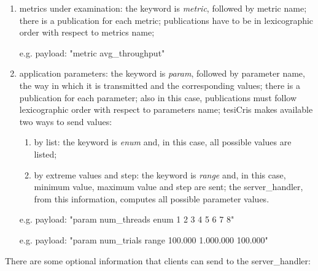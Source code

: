 \begin{enumerate}

    \item metrics under examination: the keyword is \textit{metric}, followed by metric name; there is a publication for each metric; publications have to be in lexicographic order with respect to metrics name;
    
    e.g. payload: "metric avg\_throughput"
    
    \item application parameters: the keyword is \textit{param}, followed by parameter name, the way in which it is transmitted and the corresponding values; there is a publication for each parameter; also in this case, publications must follow lexicographic order with respect to parameters name; tesiCris makes available two ways to send values:
    
    \begin{enumerate}
    
        \item by list: the keyword is \textit{enum} and, in this case, all possible values are listed;
        
        \item by extreme values and step: the keyword is \textit{range} and, in this case, minimum value, maximum value and step are sent; the ser\-ver\_han\-dler, from this information, computes all possible parameter values.
    
    \end{enumerate}
    
    e.g. payload: "param num\_threads enum 1 2 3 4 5 6 7 8"
    
    e.g. payload: "param num\_trials range 100.000 1.000.000 100.000"

\end{enumerate}

There are some optional information that clients can send to the ser\-ver\_handler:

